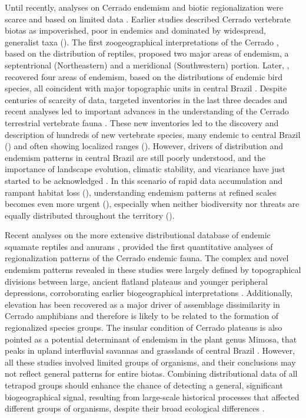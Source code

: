 \documentclass[12pt,openright,oneside,a4paper,english]{abntex2}
\begin{document}
Until recently, analyses on Cerrado endemism and biotic regionalization were scarce and based on limited data \citep{Colli2020}. Earlier studies described Cerrado vertebrate biotas as impoverished, poor in endemics and dominated by widespread, generalist taxa (\citealp[see][]{Vanzolini1963, Sick1965}). The first zoogeographical interpretations of the Cerrado \citep{Vanzolini1963}, based on the distribution of reptiles, proposed two major areas of endemism, a septentrional (Northeastern) and a meridional (Southwestern) portion. Later, \citet{Silva1997}, recovered four areas of endemism, based on the distributions of endemic bird species, all coincident with major topographic units in central Brazil \citep{Silva1997}. Despite centuries of scarcity of data, targeted inventories in the last three decades and recent analyses led to important advances in the understanding of the Cerrado terrestrial vertebrate fauna \citep{Nogueira2010, Carmignotto2012, Valdujo2012, Azevedo2016}. These new inventories led to the discovery and description of hundreds of new vertebrate species, many endemic to central Brazil (\citealp[see examples in][]{Nogueira2010}) and often showing localized ranges (\citealp[see trends in][]{Gaston1996}). However, drivers of distribution and endemism patterns in central Brazil are still poorly understood, and the importance of landscape evolution, climatic stability, and vicariance have just started to be acknowledged \citep{Silva1997, Lopes2008, Nogueira2011, Werneck2011, Azevedo2016, Carmignotto2022}. In this scenario of rapid data accumulation and rampant habitat loss (\citealp[see][]{Colli2020}), understanding endemism patterns at refined scales becomes even more urgent (\citealp[see][]{Brooks2006}), especially when neither biodiversity nor threats are equally distributed throughout the territory (\citealp[e.g.][]{Azevedo2016, Strassburg2017, Francoso2020}).

Recent analyses on the more extensive distributional database of endemic squamate reptiles and anurans \citep{Nogueira2011, Azevedo2016}, provided the first quantitative analyses of regionalization patterns of the Cerrado endemic fauna. The complex and novel endemism patterns revealed in these studies were largely defined by topographical divisions between large, ancient flatland plateaus and younger peripheral depressions, corroborating earlier biogeographical interpretations \citep{BrownGiff2002, Silva2002}. Additionally, elevation has been recovered as a major driver of assemblage dissimilarity in Cerrado amphibians \citep{Valdujo2013} and therefore is likely to be related to the formation of regionalized species groups. The insular condition of Cerrado plateaus is also pointed as a potential determinant of endemism in the plant genus Mimosa, that peaks in upland interfluvial savannas and grasslands of central Brazil \citep{Simon2000}. However, all these studies involved limited groups of organisms, and their conclusions may not reflect general patterns for entire biotas. Combining distributional data of all tetrapod groups should enhance the chance of detecting a general, significant biogeographical signal, resulting from large-scale historical processes that affected different groups of organisms, despite their broad ecological differences \citep{Roll2017}.
\end{document}
